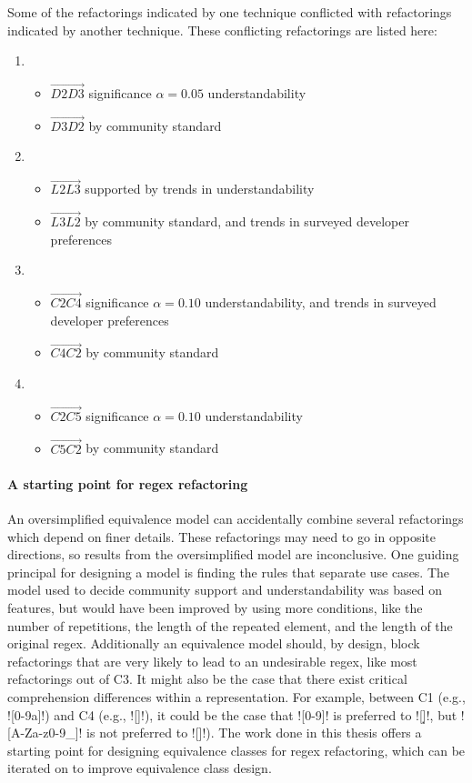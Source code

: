 Some of the refactorings indicated by one technique conflicted with refactorings indicated by another technique.  These conflicting refactorings are listed here:
\begin{enumerate}
\item \begin{itemize}
\item   $\overrightarrow{D2 D3}$ significance $\alpha=0.05$ understandability
\item   $\overrightarrow{D3 D2}$ by community standard
\end{itemize}
\item \begin{itemize}
\item   $\overrightarrow{L2 L3}$ supported by trends in understandability
\item   $\overrightarrow{L3 L2}$ by community standard, and trends in surveyed developer preferences
\end{itemize}
\item \begin{itemize}
\item   $\overrightarrow{C2 C4}$ significance $\alpha=0.10$ understandability, and trends in surveyed developer preferences
\item   $\overrightarrow{C4 C2}$ by community standard
\end{itemize}
\item \begin{itemize}
\item   $\overrightarrow{C2 C5}$ significance $\alpha=0.10$ understandability
\item   $\overrightarrow{C5 C2}$ by community standard
\end{itemize}
\end{enumerate}


\paragraph{A starting point for regex refactoring}  An oversimplified equivalence model can accidentally combine several refactorings which depend on finer details.  These refactorings may need to go in opposite directions, so results from the oversimplified model are inconclusive.  One guiding principal for designing a model is finding the rules that separate use cases.  The model used to decide community support and understandability was based on features, but would have been improved by using more conditions, like the number of repetitions, the length of the repeated element, and the length of the original regex.  Additionally an equivalence model should, by design, block refactorings that are very likely to lead to an undesirable regex, like most refactorings out of C3.  It might also be the case that there exist critical comprehension differences within a representation. For example, between C1 (e.g., \cverb![0-9a]!) and C4 (e.g., \cverb![\da]!), it could be the case that \cverb![0-9]! is preferred to \cverb![\d]!, but \cverb![A-Za-z0-9_]! is not preferred to \cverb![\w]!). The work done in this thesis offers a starting point for designing equivalence classes for regex refactoring, which can be iterated on to improve equivalence class design.


